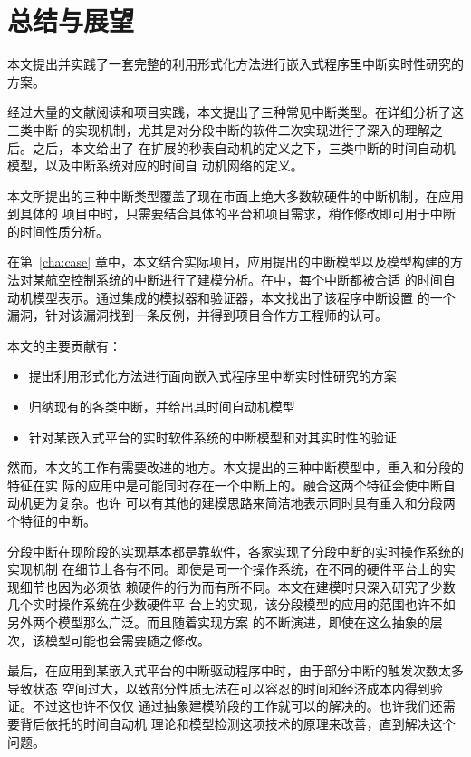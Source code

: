 
\chapter{总结与展望}
\label{cha:sum}

本文提出并实践了一套完整的利用形式化方法进行嵌入式程序里中断实时性研究的方案。

经过大量的文献阅读和项目实践，本文提出了三种常见中断类型。在详细分析了这三类中断
的实现机制，尤其是对分段中断的软件二次实现进行了深入的理解之后。之后，本文给出了
在扩展的秒表自动机的定义之下，三类中断的时间自动机模型，以及中断系统对应的时间自
动机网络的定义。

本文所提出的三种中断类型覆盖了现在市面上绝大多数软硬件的中断机制，在应用到具体的
项目中时，只需要结合具体的平台和项目需求，稍作修改即可用于中断的时间性质分析。

在第~\ref{cha:case} 章中，本文结合实际项目，应用提出的中断模型以及模型构建的方
法对某航空控制系统的中断进行了建模分析。在\uppaal 中，每个中断都被合适
的时间自动机模型表示。通过\uppaal 集成的模拟器和验证器，本文找出了该程序中断设置
的一个漏洞，针对该漏洞找到一条反例，并得到项目合作方工程师的认可。

本文的主要贡献有：

\begin{itemize}
	\item 提出利用形式化方法进行面向嵌入式程序里中断实时性研究的方案
	\item 归纳现有的各类中断，并给出其时间自动机模型
	\item 针对某嵌入式平台的实时软件系统的中断模型和对其实时性的验证
\end{itemize}

然而，本文的工作有需要改进的地方。本文提出的三种中断模型中，重入和分段的特征在实
际的应用中是可能同时存在一个中断上的。融合这两个特征会使中断自动机更为复杂。也许
可以有其他的建模思路来简洁地表示同时具有重入和分段两个特征的中断。

分段中断在现阶段的实现基本都是靠软件，各家实现了分段中断的实时操作系统的实现机制
在细节上各有不同。即使是同一个操作系统，在不同的硬件平台上的实现细节也因为必须依
赖硬件的行为而有所不同。本文在建模时只深入研究了少数几个实时操作系统在少数硬件平
台上的实现，该分段模型的应用的范围也许不如另外两个模型那么广泛。而且随着实现方案
的不断演进，即使在这么抽象的层次，该模型可能也会需要随之修改。

最后，在应用到某嵌入式平台的中断驱动程序中时，由于部分中断的触发次数太多导致状态
空间过大，以致部分性质无法在可以容忍的时间和经济成本内得到验证。不过这也许不仅仅
通过抽象建模阶段的工作就可以的解决的。也许我们还需要\uppaal 背后依托的时间自动机
理论和模型检测这项技术的原理来改善，直到解决这个问题。

